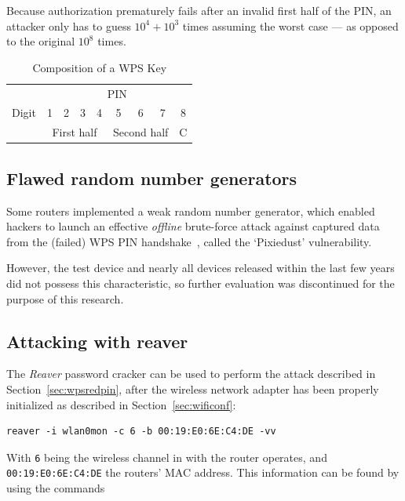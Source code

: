 Because authorization prematurely fails after an invalid first half of the PIN, an attacker only has to guess $10^4 + 10^3$ times assuming the worst case --- as opposed to the original $10^8$ times.

\begin{table}[]
\centering
\caption{Composition of a WPS Key}\label{tbl:wpskey}
\begin{tabular}{l|c|c|c|c|c|c|c|l|}
\cline{2-9}
 & \multicolumn{8}{c|}{PIN} \\ \cline{2-9} 
Digit & 1 & 2 & 3 & 4 & 5 & 6 & 7 & \multicolumn{1}{c|}{8} \\ \cline{2-9} 
 & \multicolumn{4}{c|}{First half} & \multicolumn{3}{c|}{Second half} & C \\ \cline{2-9} 
\end{tabular}
\end{table}

\subsection{Flawed random number generators}

Some routers implemented a weak random number generator, which enabled hackers to launch an effective \emph{offline} brute-force attack against captured data from the (failed) WPS PIN handshake~\cite{Bongard14}, called the `Pixiedust' vulnerability.

However, the test device and nearly all devices released within the last few years did not possess this characteristic, so further evaluation was discontinued for the purpose of this research.

\subsection{Attacking with reaver}

The \emph{Reaver} password cracker can be used to perform the attack described in Section~\ref{sec:wpsredpin}, after the wireless network adapter has been properly initialized as described in Section~\ref{sec:wificonf}:

\begin{lstlisting}[basicstyle=\ttfamily]
reaver -i wlan0mon -c 6 -b 00:19:E0:6E:C4:DE -vv
\end{lstlisting}

With \lstinline[basicstyle=\ttfamily]{6} being the wireless channel in with the router operates, and \lstinline[basicstyle=\ttfamily]{00:19:E0:6E:C4:DE} the routers' MAC address. This information can be found by using the commands

